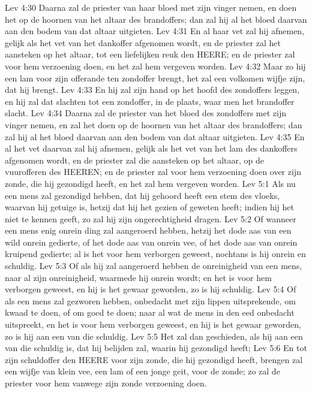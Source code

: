 Lev 4:30  Daarna zal de priester van haar bloed met zijn vinger nemen, en doen het op de hoornen van het altaar des brandoffers; dan zal hij al het bloed daarvan aan den bodem van dat altaar uitgieten.
Lev 4:31  En al haar vet zal hij afnemen, gelijk als het vet van het dankoffer afgenomen wordt, en de priester zal het aansteken op het altaar, tot een liefelijken reuk den HEERE; en de priester zal voor hem verzoening doen, en het zal hem vergeven worden.
Lev 4:32  Maar zo hij een lam voor zijn offerande ten zondoffer brengt, het zal een volkomen wijfje zijn, dat hij brengt.
Lev 4:33  En hij zal zijn hand op het hoofd des zondoffers leggen, en hij zal dat slachten tot een zondoffer, in de plaats, waar men het brandoffer slacht.
Lev 4:34  Daarna zal de priester van het bloed des zondoffers met zijn vinger nemen, en zal het doen op de hoornen van het altaar des brandoffers; dan zal hij al het bloed daarvan aan den bodem van dat altaar uitgieten.
Lev 4:35  En al het vet daarvan zal hij afnemen, gelijk als het vet van het lam des dankoffers afgenomen wordt, en de priester zal die aansteken op het altaar, op de vuurofferen des HEEREN; en de priester zal voor hem verzoening doen over zijn zonde, die hij gezondigd heeft, en het zal hem vergeven worden.
Lev 5:1  Als nu een mens zal gezondigd hebben, dat hij gehoord heeft een stem des vloeks, waarvan hij getuige is, hetzij dat hij het gezien of geweten heeft; indien hij het niet te kennen geeft, zo zal hij zijn ongerechtigheid dragen.
Lev 5:2  Of wanneer een mens enig onrein ding zal aangeroerd hebben, hetzij het dode aas van een wild onrein gedierte, of het dode aas van onrein vee, of het dode aas van onrein kruipend gedierte; al is het voor hem verborgen geweest, nochtans is hij onrein en schuldig.
Lev 5:3  Of als hij zal aangeroerd hebben de onreinigheid van een mens, naar al zijn onreinigheid, waarmede hij onrein wordt; en het is voor hem verborgen geweest, en hij is het gewaar geworden, zo is hij schuldig.
Lev 5:4  Of als een mens zal gezworen hebben, onbedacht met zijn lippen uitsprekende, om kwaad te doen, of om goed te doen; naar al wat de mens in den eed onbedacht uitspreekt, en het is voor hem verborgen geweest, en hij is het gewaar geworden, zo is hij aan een van die schuldig.
Lev 5:5  Het zal dan geschieden, als hij aan een van die schuldig is, dat hij belijden zal, waarin hij gezondigd heeft;
Lev 5:6  En tot zijn schuldoffer den HEERE voor zijn zonde, die hij gezondigd heeft, brengen zal een wijfje van klein vee, een lam of een jonge geit, voor de zonde; zo zal de priester voor hem vanwege zijn zonde verzoening doen.
